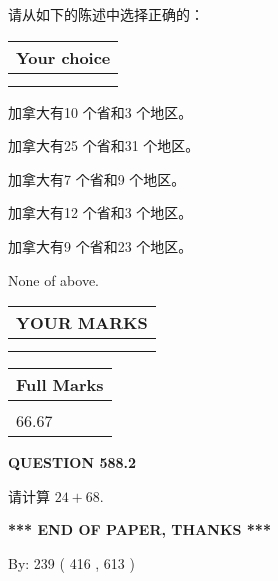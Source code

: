 \documentclass{ctexart}
\begin{document}
  
请从如下的陈述中选择正确的：
  
  
\noindent\hspace{3.0in} \begin{tabular}{|l|}
\hline
Your choice \\
\hline
 \\ 
 \\ 
\hline
\end{tabular}
  
  
 
 
加拿大有10 个省和3 个地区。
 
 
加拿大有25 个省和31 个地区。
 
 
加拿大有7 个省和9 个地区。
 
 
加拿大有12 个省和3 个地区。
 
 
加拿大有9 个省和23 个地区。
 
 
 None of above.
 
 
  
\vspace{0.2in}
  
\noindent\begin{tabular}{|l|}
\hline
 YOUR MARKS  \\
\hline
 \\ 
 \\ 
\hline
\end{tabular}
\hspace{0.05in} \begin{tabular}{|l|}
\hline
 Full Marks  \\
\hline
 \\ 
66.67 \\
\hline
\end{tabular}
{\textbf{\Large{QUESTION
588.2 
}}}
  
  
 
请计算 $ %
24 +  %
68 $.
 

 

 
   
   
 \vspace{0.2in}
 
   
   
   
   
\vspace{1.0in} 
{\textbf{\large{ *** END OF PAPER, THANKS *** }}} 
   
   
\hspace{1.0in} By: 
 239 ( 416 ,  613 )
   
\end{document}
